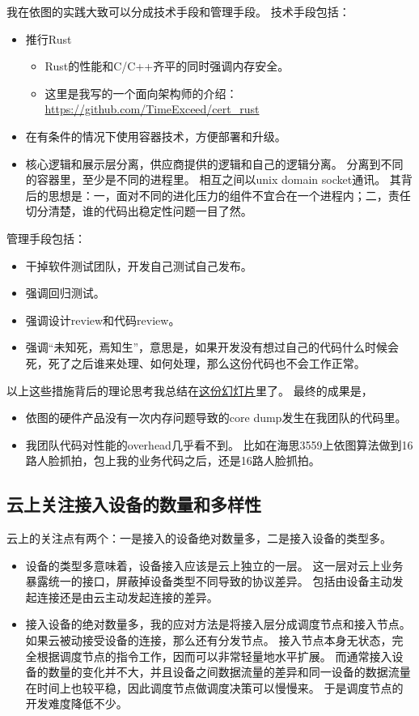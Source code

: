 \documentclass[scheme=plain]{ctexart}
\begin{document}
我在依图的实践大致可以分成技术手段和管理手段。
技术手段包括：
\begin{itemize}
    \item 推行Rust
        \begin{itemize}
            \item Rust的性能和C/C++齐平的同时强调内存安全。
            \item 这里是我写的一个面向架构师的介绍：\url{https://github.com/TimeExceed/cert_rust}
        \end{itemize}
    \item 在有条件的情况下使用容器技术，方便部署和升级。
    \item 核心逻辑和展示层分离，供应商提供的逻辑和自己的逻辑分离。
        分离到不同的容器里，至少是不同的进程里。
        相互之间以unix domain socket通讯。
        其背后的思想是：一，面对不同的进化压力的组件不宜合在一个进程内；二，责任切分清楚，谁的代码出稳定性问题一目了然。
\end{itemize}
管理手段包括：
\begin{itemize}
    \item 干掉软件测试团队，开发自己测试自己发布。
    \item 强调回归测试。
    \item 强调设计review和代码review。
    \item 强调“未知死，焉知生”，意思是，如果开发没有想过自己的代码什么时候会死，死了之后谁来处理、如何处理，那么这份代码也不会工作正常。
\end{itemize}
以上这些措施背后的理论思考我总结在\href{https://github.com/TimeExceed/design-principles/blob/master/se-principles.notes.pdf}{这份幻灯片}里了。
最终的成果是，
\begin{itemize}
    \item 依图的硬件产品没有一次内存问题导致的core dump发生在我团队的代码里。
    \item 我团队代码对性能的overhead几乎看不到。
        比如在海思3559上依图算法做到16路人脸抓拍，包上我的业务代码之后，还是16路人脸抓拍。
\end{itemize}

\subsection{云上关注接入设备的数量和多样性}

云上的关注点有两个：一是接入的设备绝对数量多，二是接入设备的类型多。
\begin{itemize}
    \item 设备的类型多意味着，设备接入应该是云上独立的一层。
        这一层对云上业务暴露统一的接口，屏蔽掉设备类型不同导致的协议差异。
        包括由设备主动发起连接还是由云主动发起连接的差异。
    \item 接入设备的绝对数量多，我的应对方法是将接入层分成调度节点和接入节点。
        如果云被动接受设备的连接，那么还有分发节点。
        接入节点本身无状态，完全根据调度节点的指令工作，因而可以非常轻量地水平扩展。
        而通常接入设备的数量的变化并不大，并且设备之间数据流量的差异和同一设备的数据流量在时间上也较平稳，因此调度节点做调度决策可以慢慢来。
        于是调度节点的开发难度降低不少。
\end{itemize}
\end{document}
